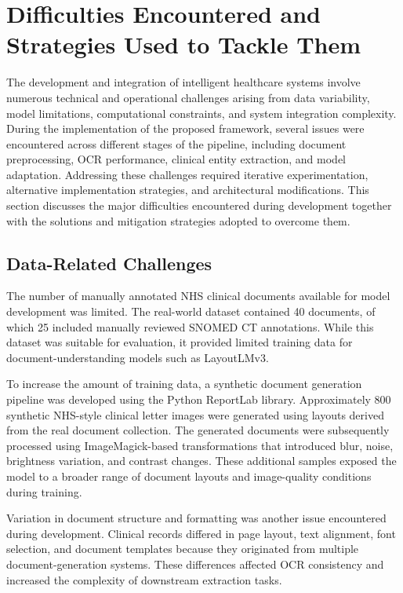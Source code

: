 \section{Difficulties Encountered and Strategies Used to Tackle Them}

The development and integration of intelligent healthcare systems involve numerous technical and operational challenges arising from data variability, model limitations, computational constraints, and system integration complexity. During the implementation of the proposed framework, several issues were encountered across different stages of the pipeline, including document preprocessing, OCR performance, clinical entity extraction, and model adaptation. Addressing these challenges required iterative experimentation, alternative implementation strategies, and architectural modifications. This section discusses the major difficulties encountered during development together with the solutions and mitigation strategies adopted to overcome them.

\subsection{Data-Related Challenges}
The number of manually annotated NHS clinical documents available for model development was limited. The real-world dataset contained 40 documents, of which 25 included manually reviewed SNOMED CT annotations. While this dataset was suitable for evaluation, it provided limited training data for document-understanding models such as LayoutLMv3.

To increase the amount of training data, a synthetic document generation pipeline was developed using the Python ReportLab library. Approximately 800 synthetic NHS-style clinical letter images were generated using layouts derived from the real document collection. The generated documents were subsequently processed using ImageMagick-based transformations that introduced blur, noise, brightness variation, and contrast changes. These additional samples exposed the model to a broader range of document layouts and image-quality conditions during training.

Variation in document structure and formatting was another issue encountered during development. Clinical records differed in page layout, text alignment, font selection, and document templates because they originated from multiple document-generation systems. These differences affected OCR consistency and increased the complexity of downstream extraction tasks.

